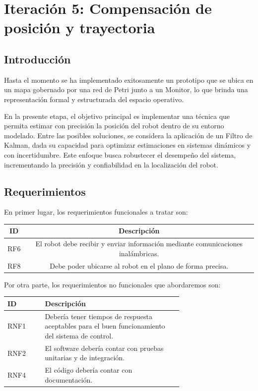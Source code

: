 \newpage
\section{Iteración 5: Compensación de posición y trayectoria}

\subsection{Introducción}

Hasta el momento se ha implementado exitosamente un prototipo que se ubica en un mapa gobernado por una red de Petri junto a un Monitor, lo que brinda una representación formal y estructurada del espacio operativo.

En la presente etapa, el objetivo principal es implementar una técnica que permita estimar con precisión la posición del robot dentro de su entorno modelado. Entre las posibles soluciones, se considera la aplicación de un Filtro de Kalman, dada su capacidad para optimizar estimaciones en sistemas dinámicos y con incertidumbre. Este enfoque busca robustecer el desempeño del sistema, incrementando la precisión y confiabilidad en la localización del robot.

\subsection{Requerimientos}

En primer lugar, los requerimientos funcionales a tratar son:

\begin{center} \begin{tabular}{|c|c|} 
\hline
    ID & Descripción \\
\hline
    RF6 & El robot debe recibir y enviar información mediante comunicaciones inalámbricas. \\ 
\hline
    RF8 & Debe poder ubicarse al robot en el plano de forma precisa. \\
\hline
\end{tabular} \end{center}

Por otra parte, los requerimientos no funcionales que abordaremos son:

\begin{center} \begin{tabular}{|p{0.15\linewidth}|p{0.55\linewidth}|} 
\hline
    ID & Descripción \\
\hline
    RNF1 & Debería tener tiempos de respuesta aceptables para el buen funcionamiento del sistema de control. \\
\hline
    RNF2 & El software debería contar con pruebas unitarias y de integración. \\
\hline
    RNF4 & El código debería contar con documentación. \\
\hline
\end{tabular} \end{center}


